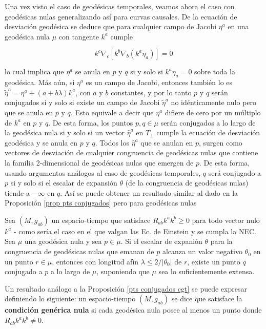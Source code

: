 Una vez visto el caso de geodésicas temporales, veamos ahora el caso con geodésicas nulas generalizando así para curvas causales. De la ecuación de desviación geodésica se deduce que para cualquier campo de Jacobi $\eta^a$ en una geodésica nula $\mu$ con tangente $k^a$ cumple 


$$
k^c\nabla_c[k^b\nabla_b(k^a\eta_a)]=0
$$


lo cual implica que $\eta^a$ se anula en $p$ y $q$ si y solo si $k^a\eta_a=0$ sobre toda la geodésica. Más aún, si $\eta^a$ es un campo de Jacobi, entonces también lo es $\tilde{\eta}^a=\eta^a+(a+b\lambda)k^a$, con $a$ y $b$ constantes, y por lo tanto $p$ y $q$ serán conjugados si y solo si existe un campo de Jacobi $\tilde{\eta}^a$ no idénticamente nulo pero que se anula en $p$ y $q$. Esto equivale a decir que $\eta^a$ difiere de cero por un  múltiplo de $k^a$ en $p$ y $q$. De esta forma, los puntos $p,q\in \mu$ serán conjugados a lo largo de la geodésica nula si y solo si un vector $\hat{\eta}^a$ en $T_\perp$ cumple la ecuación de desviación geodésica y se anula en $p$ y $q$. Todos los $\hat{\eta}^a$ que se anulan en $p$, surgen como vectores de desviación de cualquier congruencia de geodésicas nulas que contiene la familia 2-dimensional de geodésicas nulas que emergen de $p$. De esta forma, usando argumentos análogos al caso de geodésicas temporales, $q$ será conjugado a $p$ si y solo si el escalar de expansión $\theta$ (de la congruencia de geodésicas nulas) tiende a $-\infty$ en $q$. Así se puede obtener un resultado similar al dado en la Proposición \ref{prop pts conjugados} pero para geodésicas nulas

\begin{proposition}\label{pts conjugados null}
Sea $(M,g_{ab})$ un espacio-tiempo que satisface $R_{ab}k^ak^b\geq0$ para todo vector nulo $k^a$ - como sería el caso en el que valgan las Ec. de Einstein y se cumpla la NEC. Sea $\mu$ una geodésica nula y sea $p\in \mu$. Si el escalar de expanión $\theta$ para la congruencia de geodésicas nulas que emanan de $p$ alcanza un valor negativo $\theta_0$ en un punto $r\in \mu$, entonces con longitud afín $\lambda\leq2/|\theta_0|$ de $r$, existe un punto $q$ conjugado a $p$ a lo largo de $\mu$, suponiendo que $\mu$ sea lo suficientemente extensa.
\end{proposition}


Un resultado análogo a la Proposición \ref{pts conjugados cgt} se puede expresar definiendo lo siguiente: un espacio-tiempo $(M,g_{ab})$ se dice que satisface la \textbf{condición genérica nula} si cada geodésica nula posee al menos un punto donde $R_{ab}k^ak^b\neq0$.

